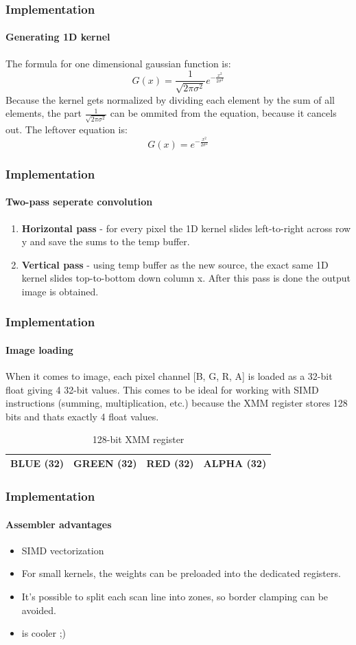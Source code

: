 \documentclass[utf-8]{beamer}
\begin{document}
\begin{frame}
    \frametitle{Implementation}
    \framesubtitle{Generating 1D kernel}
    The formula for one dimensional gaussian function is:
    \[G(x) = \frac{1}{\sqrt{2\pi\sigma^2}}e^{-\frac{x^2}{2\sigma^2}}\]
    Because the kernel gets normalized by dividing each element by the sum of all elements, the part $\frac{1}{\sqrt{2\pi\sigma^2}}$ can be ommited from the equation, because it cancels out. The leftover equation is: 
    \[G(x) = e^{-\frac{x^2}{2\sigma^2}}\]

\end{frame}
\begin{frame}
    \frametitle{Implementation}
    \framesubtitle{Two-pass seperate convolution}
    \begin{enumerate}
        \item \textbf{Horizontal pass} - for every pixel the 1D kernel slides left-to-right across row y and save the sums to the temp buffer.
        \item \textbf{Vertical pass} - using temp buffer as the new source, the exact same 1D kernel slides top-to-bottom down column x. After this pass is done the output image is obtained.
    \end{enumerate}

\end{frame}

\begin{frame}
    \frametitle{Implementation}
    \framesubtitle{Image loading}
    When it comes to image, each pixel channel [B, G, R, A] is loaded as a 32-bit float giving 4 32-bit values.
    This comes to be ideal for working with SIMD instructions (summing, multiplication, etc.) because the XMM register stores 128 bits and thats exactly 4 float values.
    \begin{table}[h!]
        \centering
        \begin{tabular}{|c|c|c|c|}
            \hline
            \cellcolor{blue!25} BLUE (32) & 
            \cellcolor{green!25} GREEN (32) & 
            \cellcolor{red!25} RED (32) & 
            \cellcolor{yellow!35} ALPHA (32) \\
            \hline
        \end{tabular}
        \caption{128-bit XMM register}
    \end{table}
\end{frame}

\begin{frame}
    \frametitle{Implementation}
    \framesubtitle{Assembler advantages}
    \begin{itemize}
        \item SIMD vectorization
        \item For small kernels, the weights can be preloaded into the dedicated registers.
        \item It's possible to split each scan line into zones, so border clamping can be avoided.
        \item is cooler ;)
    \end{itemize}
\end{frame}
\end{document}
